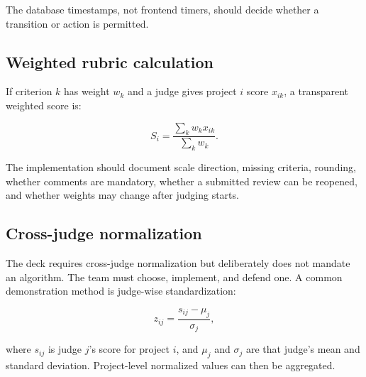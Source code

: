 \documentclass[11pt]{article}
\begin{document}
\begin{center}
\end{center}

The database timestamps, not frontend timers, should decide whether a transition or action is permitted.

\subsection{Weighted rubric calculation}

If criterion $k$ has weight $w_k$ and a judge gives project $i$ score $x_{ik}$, a transparent weighted score is:

\[
S_i = \frac{\sum_k w_k x_{ik}}{\sum_k w_k}.
\]

The implementation should document scale direction, missing criteria, rounding, whether comments are mandatory, whether a submitted review can be reopened, and whether weights may change after judging starts.

\subsection{Cross-judge normalization}

The deck requires cross-judge normalization but deliberately does not mandate an algorithm. The team must choose, implement, and defend one. A common demonstration method is judge-wise standardization:

\[
z_{ij}=\frac{s_{ij}-\mu_j}{\sigma_j},
\]

where $s_{ij}$ is judge $j$'s score for project $i$, and $\mu_j$ and $\sigma_j$ are that judge's mean and standard deviation. Project-level normalized values can then be aggregated.
\end{document}
